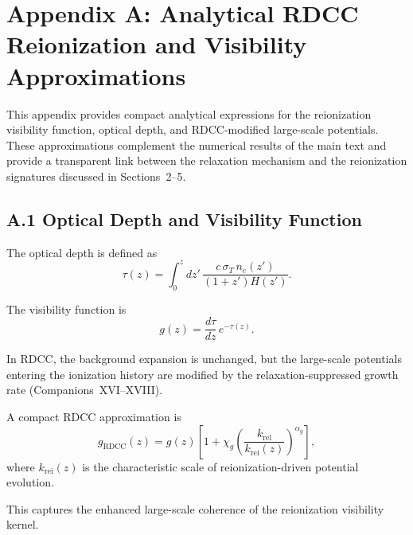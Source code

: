 \documentclass[11pt,a4paper]{article}
\begin{document}
\appendix
\section*{Appendix A: Analytical RDCC Reionization and Visibility Approximations}

This appendix provides compact analytical expressions for the reionization visibility function,
optical depth, and RDCC-modified large-scale potentials. These approximations complement
the numerical results of the main text and provide a transparent link between the relaxation
mechanism and the reionization signatures discussed in Sections~2–5.

\subsection*{A.1 Optical Depth and Visibility Function}

The optical depth is defined as
\begin{equation}
\tau(z)
=
\int_{0}^{z}
dz'\,
\frac{c\,\sigma_{T}\,n_{e}(z')}{(1+z')H(z')}.
\end{equation}

The visibility function is
\begin{equation}
g(z)
=
\frac{d\tau}{dz}\,
e^{-\tau(z)}.
\end{equation}

In RDCC, the background expansion is unchanged, but the large-scale potentials entering the
ionization history are modified by the relaxation-suppressed growth rate (Companions~XVI–XVIII).

A compact RDCC approximation is
\begin{equation}
g_{\mathrm{RDCC}}(z)
=
g(z)
\left[
1
+
\chi_{g}
\left(
\frac{k_{\mathrm{rel}}}{k_{\mathrm{rei}}(z)}
\right)^{\alpha_{g}}
\right],
\end{equation}
where $k_{\mathrm{rei}}(z)$ is the characteristic scale of reionization-driven potential evolution.

This captures the enhanced large-scale coherence of the reionization visibility kernel.

\end{document}
